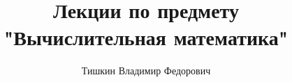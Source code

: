\documentclass[12pt]{article}
\begin{document}
	
	\title{Лекции по предмету\\"Вычислительная математика"}
	\author{Тишкин Владимир Федорович}
	\date{}
	\maketitle
	\newpage
	
	\tableofcontents
	
	
		
	
	
	
	
\end{document}

